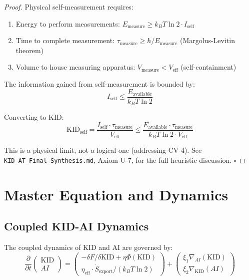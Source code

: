 \documentclass[11pt,a4paper]{article}
\begin{document}
\begin{proof}
Physical self-measurement requires:
\begin{enumerate}[label=(\roman*)]
\item Energy to perform measurements: $E_{\text{measure}} \geq k_B T \ln 2 \cdot I_{\text{self}}$
\item Time to complete measurement: $\tau_{\text{measure}} \geq \hbar/E_{\text{measure}}$ (Margolus-Levitin theorem)
\item Volume to house measuring apparatus: $V_{\text{measure}} < V_{\text{eff}}$ (self-containment)
\end{enumerate}

The information gained from self-measurement is bounded by:
\begin{equation}
I_{\text{self}} \leq \frac{E_{\text{available}}}{k_B T \ln 2}
\end{equation}

Converting to KID:
\begin{equation}
\text{KID}_{\text{self}} = \frac{I_{\text{self}} \cdot \tau_{\text{measure}}}{V_{\text{eff}}} \leq \frac{E_{\text{available}} \cdot \tau_{\text{measure}}}{k_B T \ln 2 \cdot V_{\text{eff}}}
\end{equation}

This is a physical limit, not a logical one (addressing CV-4). See \texttt{KID\_AT\_Final\_Synthesis.md}, Axiom U-7, for the full heuristic discussion. \hfill $\square$
\end{proof}

\section{Master Equation and Dynamics}

\subsection{Coupled KID-AI Dynamics}

The coupled dynamics of KID and AI are governed by:
\begin{equation}
\boxed{\frac{\partial}{\partial t}\begin{pmatrix} \text{KID} \\ AI \end{pmatrix} = \begin{pmatrix} -\delta F/\delta \text{KID} + \eta \Phi(\text{KID}) \\ \eta_{\text{eff}} \cdot \dot{S}_{\text{export}} / (k_B T \ln 2) \end{pmatrix} + \begin{pmatrix} \xi_1 \nabla_{AI}(\text{KID}) \\ \xi_2 \nabla_{\text{KID}}(AI) \end{pmatrix}}
\end{equation}
\end{document}
